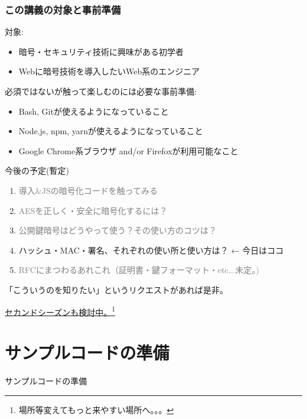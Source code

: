\documentclass[12pt,dvipdfmx]{beamer}
\begin{document}


\begin{frame}
\frametitle{この講義の対象と事前準備}
対象:
\begin{itemize}
\item 暗号・セキュリティ技術に興味がある初学者
\item Webに暗号技術を導入したいWeb系のエンジニア
\end{itemize}

\vspace{2ex}

必須ではないが触って楽しむのには必要な事前準備:
\begin{itemize}
\item Bash, Gitが使えるようになっていること
\item Node.js, npm, yarnが使えるようになっていること
\item Google Chrome系ブラウザ and/or Firefoxが利用可能なこと
\end{itemize}
\end{frame}

\begin{frame}
今後の予定(暫定)
\begin{enumerate}
 \item \textcolor{gray}{導入\&JSの暗号化コードを触ってみる}
 \item \textcolor{gray}{AESを正しく・安全に暗号化するには？}
 \item \textcolor{gray}{公開鍵暗号はどうやって使う？その使い方のコツは？}
 \item \alert{ハッシュ・MAC・署名、それぞれの使い所と使い方は？} ← 今日はココ
 \item \textcolor{gray}{RFCにまつわるあれこれ（証明書・鍵フォーマット・etc...未定。)}
\end{enumerate}
「こういうのを知りたい」というリクエストがあれば是非。

\vspace{2ex}

\underline{セカンドシーズンも検討中。}\footnote[frame]{場所等変えてもっと来やすい場所へ。。。}
\end{frame}

\section{サンプルコードの準備}
\begin{frame}
\centering
{\Large サンプルコードの準備}
\end{frame}
\end{document}
